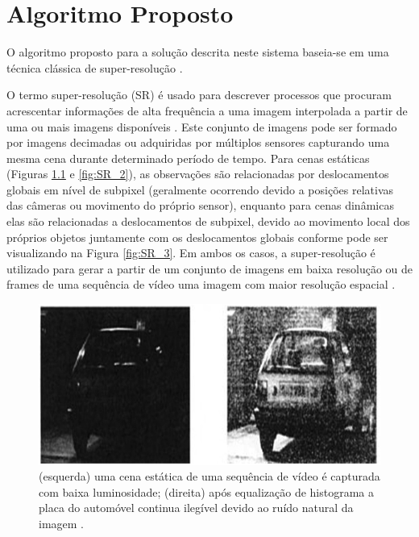 \chapter[Algoritmo Proposto]{Algoritmo Proposto}

O algoritmo proposto para a solução descrita neste sistema baseia-se em uma técnica clássica de super-resolução \cite{garcia2013tecnicas}.

O termo super-resolução (SR) é usado para descrever processos que procuram acrescentar informações de alta frequência a uma imagem interpolada a partir de uma ou mais imagens disponíveis \cite{baker2002limits}\cite{park2003super}\cite{farsiu2004advances}. Este conjunto de imagens pode ser formado por imagens decimadas ou adquiridas por múltiplos sensores capturando uma mesma cena durante determinado período de tempo. Para cenas estáticas (Figuras \ref{fig:SR_1} e \ref{fig:SR_2}), as observações são relacionadas por deslocamentos globais em nível de subpixel (geralmente ocorrendo devido a posições relativas das câmeras ou movimento do próprio sensor), enquanto para cenas dinâmicas elas são relacionadas a deslocamentos de subpixel, devido ao movimento local dos próprios objetos juntamente com os deslocamentos globais conforme pode ser visualizando na Figura \ref{fig:SR_3}. Em ambos os casos, a super-resolução é utilizado para gerar a partir de um conjunto de imagens em baixa resolução ou de frames de uma sequência de vídeo uma imagem com maior resolução espacial \cite{figueira2013super}\cite{milanfar2010super}.
\\
\begin{figure}[h]
	\centering
	\includegraphics[scale=0.65]{figuras/SR_img_1.png}
	\caption{(esquerda) uma cena estática de uma sequência de vídeo é capturada com baixa luminosidade; (direita) após equalização de histograma a placa do automóvel continua ilegível devido ao ruído     natural da imagem \cite{kang2000digital}.}
	\label{fig:SR_1}
\end{figure}

